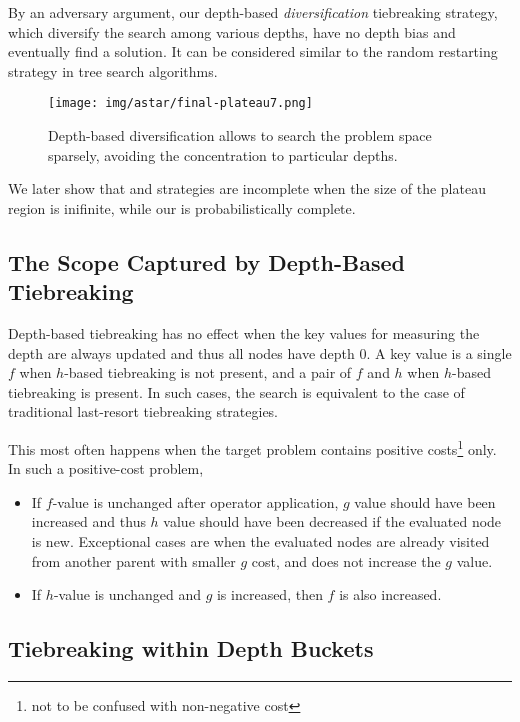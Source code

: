 By an adversary argument, our depth-based \emph{diversification}
tiebreaking strategy, which diversify the search among various depths,
have no depth bias and eventually find a solution. It can be considered
similar to the random restarting strategy in tree search algorithms.

\begin{figure}[htbp]
 \texttt{[image: img/astar/final-plateau7.png]}
 \caption{Depth-based diversification allows to search the problem space
 sparsely, avoiding the concentration to particular depths.}
 \label{fig:plateau-depiction-all-optimal}
\end{figure}

We later show that
\fifo and \lifo strategies are incomplete when the size of the plateau
region is inifinite, while our \id is probabilistically complete.

\subsection{The Scope Captured by Depth-Based Tiebreaking}

Depth-based tiebreaking has no effect when the key values for measuring
the depth are always updated and thus all nodes have depth 0. A key
value is a single $f$ when $h$-based tiebreaking is not present, and a
pair of $f$ and $h$ when $h$-based tiebreaking is present.  In such
cases, the search is equivalent to the case of traditional last-resort
tiebreaking strategies.

This most often happens when the target problem contains
positive costs\footnote{not to be confused with non-negative cost} only.
In such a positive-cost problem,
\begin{itemize}
 \item If $f$-value is unchanged after operator application, $g$ value
       should have been increased and thus $h$ value should have been
       decreased if the evaluated node is new. Exceptional cases are
       when the evaluated nodes are already visited from another parent
       with smaller $g$ cost, and does not increase the $g$ value.
 \item If $h$-value is unchanged and $g$ is increased, then $f$ is also increased.
\end{itemize}

\subsection{Tiebreaking within Depth Buckets}

